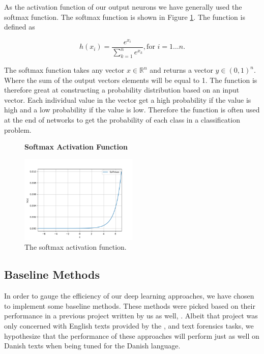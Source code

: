 As the activation function of our output neurons we have generally
used the softmax function. The softmax function is shown in Figure
\ref{fig:softmax_activation}. The function is defined as

\begin{equation}
    h(x_i) = \frac{e^{x_i}}{\sum_{k=1}^n e^{x_k}}, \text{for $i = 1 \dots n$}.
\end{equation}

The softmax function takes any vector $x \in \mathbb{R}^n$ and returns a vector
$y \in (0, 1)^n$. Where the sum of the output vectors elements will be equal to
1. The function is therefore great at constructing a probability distribution
based on an input vector. Each individual value in the vector get a high
probability if the value is high and a low probability if the value is low.
Therefore the function is often used at the end of networks to get the
probability of each class in a classification problem.

\begin{figure}
    \centering
    \textbf{Softmax Activation Function}\par\medskip
    \includegraphics[width=0.5\textwidth]{./pictures/method/softmax_function.png}
    \caption{The softmax activation function.}
    \label{fig:softmax_activation}
\end{figure}





\subsection{Baseline Methods}

In order to gauge the efficiency of our deep learning approaches, we have
chosen to implement some baseline methods. These methods were picked
based on their performance in a previous project written by us as well,
\cite{US}. Albeit that project was only concerned with English texts
provided by the \cite{pan:2015}, and \cite{pan:2014} text forensics tasks,
we hypothesize that the performance of these approaches will perform just
as well on Danish texts when being tuned for the Danish language.


